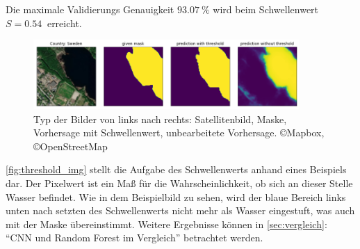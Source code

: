 Die maximale Validierungs Genauigkeit $\SI{93.07}{\percent}$ wird beim Schwellenwert $S = \SI{0.54}{}$ erreicht.

\begin{figure}
    \centering
    \includegraphics[width=0.9\textwidth]{content/img/threshold_img.png}
    \caption{Typ der Bilder von links nach rechts: Satellitenbild, Maske, Vorhersage mit Schwellenwert, unbearbeitete Vorhersage. \copyright Mapbox, \copyright OpenStreetMap}
    \label{fig:threshold_img}
\end{figure}
\autoref{fig:threshold_img} stellt die Aufgabe des Schwellenwerts anhand eines Beispiels dar.
Der Pixelwert ist ein Maß für die Wahrscheinlichkeit, ob sich an dieser Stelle Wasser befindet.
Wie in dem Beispielbild zu sehen, wird der blaue Bereich links unten nach setzten des Schwellenwerts nicht mehr als Wasser eingestuft, was auch mit der Maske übereinstimmt.
Weitere Ergebnisse können in \autoref{sec:vergleich}: \enquote{CNN und Random Forest im Vergleich} betrachtet werden.